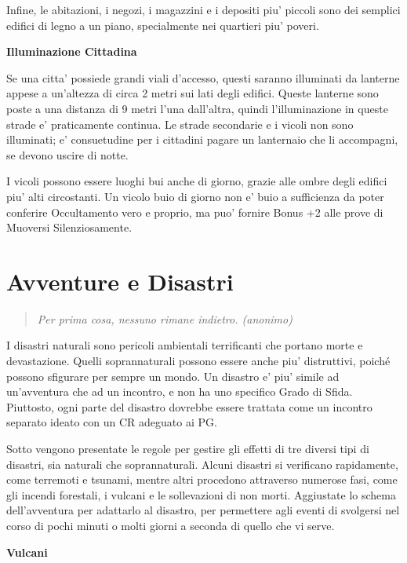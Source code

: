 \documentclass[a4paper,11pt,twoside,openany]{book}
\begin{document}
Infine, le abitazioni, i negozi, i magazzini e i depositi piu' piccoli sono dei semplici edifici di legno a un piano, specialmente nei quartieri piu' poveri.

\textbf{Illuminazione Cittadina}

Se una citta' possiede grandi viali d'accesso, questi saranno illuminati da lanterne appese a un'altezza di circa 2 metri sui lati degli edifici. Queste lanterne sono poste a una distanza di 9 metri l'una dall'altra, quindi l'illuminazione in queste strade e' praticamente continua. Le strade secondarie e i vicoli non sono illuminati; e' consuetudine per i cittadini pagare un lanternaio che li accompagni, se devono uscire di notte.

I vicoli possono essere luoghi bui anche di giorno, grazie alle ombre degli edifici piu' alti circostanti. Un vicolo buio di giorno non e' buio a sufficienza da poter conferire Occultamento vero e proprio, ma puo' fornire Bonus +2 alle prove di Muoversi Silenziosamente.

\pagebreak

\section{Avventure e Disastri}

\label{avventure-e-disastri}
\begin{quote}\textit{
Per prima cosa, nessuno rimane indietro. (anonimo)
}\end{quote}
I disastri naturali sono pericoli ambientali terrificanti che portano morte e devastazione. Quelli soprannaturali posso­no essere anche piu' distruttivi, poiché possono sfigurare per sempre un mondo. Un disastro e' piu' simile ad un'avventura che ad un incontro, e non ha uno specifico Grado di Sfida. Piuttosto, ogni parte del disastro dovrebbe essere trattata come un incontro separato ideato con un CR adeguato ai PG.

Sotto vengono presentate le regole per gestire gli effetti di tre diversi tipi di disastri, sia naturali che soprannaturali. Alcuni disastri si verificano rapidamente, come terremoti e tsunami, mentre altri procedono attraverso numerose fasi, come gli incendi forestali, i vulcani e le sollevazioni di non morti. Aggiustate lo schema dell'avventura per adattarlo al disastro, per permettere agli eventi di svolgersi nel corso di pochi minuti o molti giorni a seconda di quello che vi serve.

\textbf{Vulcani}
\end{document}
